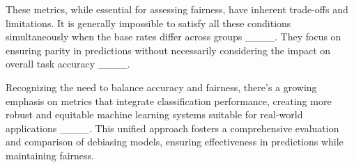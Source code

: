 These metrics, while essential for assessing fairness, have inherent trade-offs and limitations. It is generally impossible to satisfy all these conditions simultaneously when the base rates differ across groups ____. They focus on ensuring parity in predictions without necessarily considering the impact on overall task accuracy ____.




Recognizing the need to balance accuracy and fairness, there's a growing emphasis on metrics that integrate classification performance, creating more robust and equitable machine learning systems suitable for real-world applications ____. This unified approach fosters a comprehensive evaluation and comparison of debiasing models, ensuring effectiveness in predictions while maintaining fairness.


